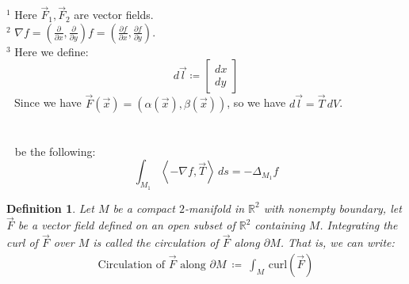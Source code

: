 \documentclass[15pt]{book}
\theoremstyle{break}
\theoremstyle{break}
\newtheorem{defn}{Definition}[corL]
\newcommand{\R}{\mathbb{R}}
\newcommand{\pd}{\partial}
\newcommand{\lr}[1]{\left(#1\right)}
\newcommand{\bmat}[1]{\begin{bmatrix} #1 \end{bmatrix}}
\begin{document}
${}^1$ Here $\vec{F}_1,\vec{F}_2$ are vector fields.\\
${}^2$ $\nabla f = \lr{\frac{\pd }{\pd x}, \frac{\pd }{\pd y}}f =\lr{\frac{\pd f}{\pd x}, \frac{\pd f}{\pd y}}$.\\
${}^3$ Here we define: $$d\vec{l} \coloneqq \bmat{dx \\ dy}$$ 
${}\ \,$ Since we have $\vec{F}(\vec{x}) =(\alpha(\vec{x}),\beta(\vec{x}))$, so we have $d\vec{l} = \vec{T} \, dV$.\\
\\ 
\\
${}\ \ $ be the following:
$$\int_{M_1} \left<-\nabla f, \vec{T} \right>\, ds = -\Delta_{M_1} f$$

\begin{defn}
Let $M$ be a compact $2$-manifold in $\R^2$ with nonempty boundary, let $\vec{F}$ be a vector field defined on an open subset of $\R^2$ containing $M$. Integrating the curl of $\vec{F}$ over $M$ is called the circulation of $\vec{F}$ along $\pd M$. That is, we can write:
\begin{align*}
\text{Circulation of }\vec{F}\text{ along }\pd M \ \coloneqq \ \int_M \, \text{curl}(\vec{F})
\end{align*}
\end{defn}
\end{document}
